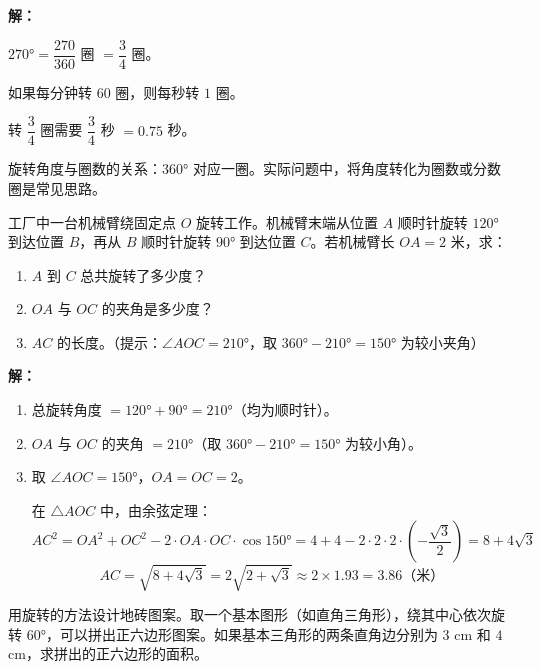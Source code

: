 \documentclass[12pt, a4paper]{ctexart}
\begin{document}
\textbf{解：}

$270° = \dfrac{270}{360}$ 圈 $= \dfrac{3}{4}$ 圈。

如果每分钟转 $60$ 圈，则每秒转 $1$ 圈。

转 $\dfrac{3}{4}$ 圈需要 $\dfrac{3}{4}$ 秒 $= 0.75$ 秒。

\begin{tipbox}[方法总结]
旋转角度与圈数的关系：$360°$ 对应一圈。实际问题中，将角度转化为圈数或分数圈是常见思路。
\end{tipbox}

\vspace{6pt}

\begin{appbox}[【应用2】机械臂的旋转定位]
工厂中一台机械臂绕固定点 $O$ 旋转工作。机械臂末端从位置 $A$ 顺时针旋转 $120°$ 到达位置 $B$，再从 $B$ 顺时针旋转 $90°$ 到达位置 $C$。若机械臂长 $OA = 2$ 米，求：
\begin{enumerate}[label=(\arabic*)]
  \item $A$ 到 $C$ 总共旋转了多少度？
  \item $OA$ 与 $OC$ 的夹角是多少度？
  \item $AC$ 的长度。（提示：$\angle AOC = 210°$，取 $360° - 210° = 150°$ 为较小夹角）
\end{enumerate}
\end{appbox}

\textbf{解：}
\begin{enumerate}[label=(\arabic*)]
  \item 总旋转角度 $= 120° + 90° = 210°$（均为顺时针）。
  \item $OA$ 与 $OC$ 的夹角 $= 210°$（取 $360° - 210° = 150°$ 为较小角）。
  \item 取 $\angle AOC = 150°$，$OA = OC = 2$。

  在 $\triangle AOC$ 中，由余弦定理：
  \[
  AC^2 = OA^2 + OC^2 - 2 \cdot OA \cdot OC \cdot \cos 150° = 4 + 4 - 2 \cdot 2 \cdot 2 \cdot \left(-\frac{\sqrt{3}}{2}\right) = 8 + 4\sqrt{3}
  \]
  \[
  AC = \sqrt{8 + 4\sqrt{3}} = 2\sqrt{2 + \sqrt{3}} \approx 2 \times 1.93 = 3.86 \text{（米）}
  \]
\end{enumerate}

\vspace{6pt}

\begin{appbox}[【应用3】瓷砖图案设计]
用旋转的方法设计地砖图案。取一个基本图形（如直角三角形），绕其中心依次旋转 $60°$，可以拼出正六边形图案。如果基本三角形的两条直角边分别为 $3$ cm 和 $4$ cm，求拼出的正六边形的面积。
\end{appbox}
\end{document}
